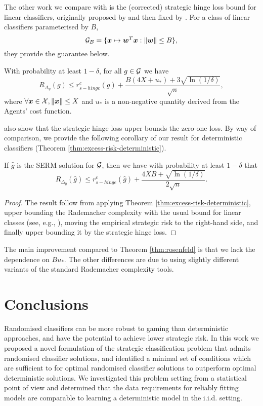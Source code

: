 The other work we compare with is the (corrected) strategic hinge loss bound for linear classifiers, originally proposed by \citet{levanon2022} and then fixed by \citet{rosenfeld2023}. For a class of linear classifiers parameterised by $B$,
\begin{equation*}
    {\mathcal{G}}_B = \{{\bm{x}} \mapsto {\bm{w}}^T {\bm{x}} : \|{\bm{w}}\| \leq B \},
\end{equation*}
they provide the guarantee below.
\begin{theorem}
    \label{thm:rosenfeld}
    With probability at least $1-\delta$, for all $g \in {\mathcal{G}}$ we have
    \begin{equation*}
        R_{\Delta_{g}}(g) \leq r_{s-hinge}^c(g) + \frac{B(4X + u_\ast) + 3 \sqrt{\ln(1/\delta)}}{\sqrt{n}},
    \end{equation*}
    where $\forall {\bm{x}} \in {\mathcal{X}}, \|{\bm{x}}\| \leq X$ and $u_\ast$ is a non-negative quantity derived from the Agents' cost function.
\end{theorem}
\citet{rosenfeld2023} also show that the strategic hinge loss upper bounds the zero-one loss. By way of comparison, we provide the following corollary of our result for deterministic classifiers (Theorem \ref{thm:excess-risk-deterministic}).
\begin{corollary}
    If $\hat{g}$ is the SERM solution for ${\mathcal{G}}$, then we have with probability at least $1-\delta$ that
    \begin{equation*}
        R_{\Delta_{\hat{g}}}(\hat{g}) \leq r_{s-hinge}^c(\hat{g}) + \frac{4XB + \sqrt{\ln(1/\delta)}}{2\sqrt{n}}.
    \end{equation*}
\end{corollary}
\begin{proof}
    The result follow from applying Theorem \ref{thm:excess-risk-deterministic}, upper bounding the Rademacher complexity with the usual bound for linear classes (see, e.g., \citet{shalev-shwartz2014}), moving the empirical strategic risk to the right-hand side, and finally upper bounding it by the strategic hinge loss.
\end{proof}
The main improvement compared to Theorem \ref{thm:rosenfeld} is that we lack the dependence on $Bu_\ast$. The other differences are due to using slightly different variants of the standard Rademacher complexity tools.

\section{Conclusions}
Randomised classifiers can be more robust to gaming than deterministic approaches, and have the potential to achieve lower strategic risk. In this work we proposed a novel formulation of the strategic classification problem that admits randomised classifier solutions, and identified a minimal set of conditions which are sufficient to for optimal randomised classifier solutions to outperform optimal deterministic solutions. We investigated this problem setting from a statistical point of view and determined that the data requirements for reliably fitting models are comparable to learning a deterministic model in the i.i.d. setting.

